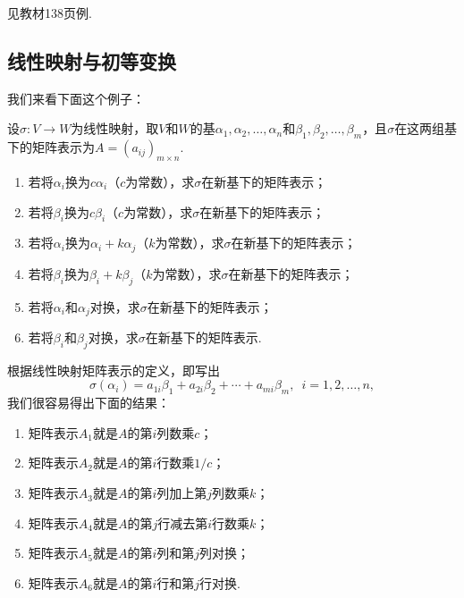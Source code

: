 \begin{solution}
    见教材138页例.
\end{solution}

\subsection{线性映射与初等变换}

我们来看下面这个例子：
\begin{example}
    设$\sigma:V\to W$为线性映射，取$V$和$W$的基$\alpha_1,\alpha_2,\ldots,\alpha_n$和$\beta_1,\beta_2,\ldots,\beta_m$，且$\sigma$在这两组基下的矩阵表示为$A=(a_{ij})_{m\times n}$.
    \begin{enumerate}
        \item 若将$\alpha_i$换为$c\alpha_i$（$c$为常数），求$\sigma$在新基下的矩阵表示；

        \item 若将$\beta_i$换为$c\beta_i$（$c$为常数），求$\sigma$在新基下的矩阵表示；

        \item 若将$\alpha_i$换为$\alpha_i+k\alpha_j$（$k$为常数），求$\sigma$在新基下的矩阵表示；

        \item 若将$\beta_i$换为$\beta_i+k\beta_j$（$k$为常数），求$\sigma$在新基下的矩阵表示；

        \item 若将$\alpha_i$和$\alpha_j$对换，求$\sigma$在新基下的矩阵表示；

        \item 若将$\beta_i$和$\beta_j$对换，求$\sigma$在新基下的矩阵表示.
    \end{enumerate}
\end{example}

\begin{solution}
    根据线性映射矩阵表示的定义，即写出
    \[\sigma(\alpha_i)=a_{1i}\beta_1+a_{2i}\beta_2+\cdots+a_{mi}\beta_m,\enspace i=1,2,\ldots,n,\]
    我们很容易得出下面的结果：
    \begin{enumerate}
        \item 矩阵表示$A_1$就是$A$的第$i$列数乘$c$；
        \item 矩阵表示$A_2$就是$A$的第$i$行数乘$1/c$；
        \item 矩阵表示$A_3$就是$A$的第$i$列加上第$j$列数乘$k$；
        \item 矩阵表示$A_4$就是$A$的第$j$行减去第$i$行数乘$k$；
        \item 矩阵表示$A_5$就是$A$的第$i$列和第$j$列对换；
        \item 矩阵表示$A_6$就是$A$的第$i$行和第$j$行对换.
    \end{enumerate}
\end{solution}

